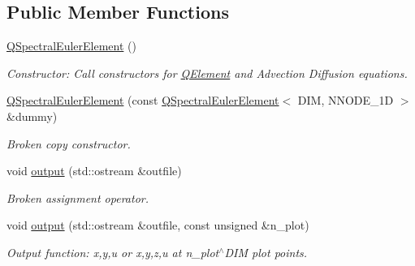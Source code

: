 \subsection*{Public Member Functions}
\begin{DoxyCompactItemize}
\item 
\hyperlink{classoomph_1_1QSpectralEulerElement_aae6a94602894f21b7596a20c7b6720dd}{Q\+Spectral\+Euler\+Element} ()
\begin{DoxyCompactList}\small\item\em Constructor\+: Call constructors for \hyperlink{classoomph_1_1QElement}{Q\+Element} and Advection Diffusion equations. \end{DoxyCompactList}\item 
\hyperlink{classoomph_1_1QSpectralEulerElement_a6ac34b1fe60d76617accddf522bb3c9b}{Q\+Spectral\+Euler\+Element} (const \hyperlink{classoomph_1_1QSpectralEulerElement}{Q\+Spectral\+Euler\+Element}$<$ D\+IM, N\+N\+O\+D\+E\+\_\+1D $>$ \&dummy)
\begin{DoxyCompactList}\small\item\em Broken copy constructor. \end{DoxyCompactList}\item 
void \hyperlink{classoomph_1_1QSpectralEulerElement_ae3771a5f57f21d3a97595856b089e467}{output} (std\+::ostream \&outfile)
\begin{DoxyCompactList}\small\item\em Broken assignment operator. \end{DoxyCompactList}\item 
void \hyperlink{classoomph_1_1QSpectralEulerElement_a026cdb8f38d01e15906db12ae1e4c4f1}{output} (std\+::ostream \&outfile, const unsigned \&n\+\_\+plot)
\begin{DoxyCompactList}\small\item\em Output function\+: x,y,u or x,y,z,u at n\+\_\+plot$^\wedge$\+D\+IM plot points. \end{DoxyCompactList}\end{DoxyCompactItemize}
